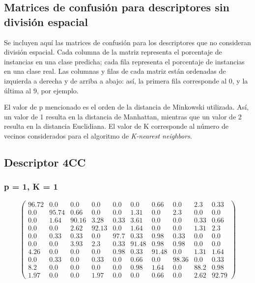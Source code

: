 \begin{appendices}

\section{Matrices de confusión para descriptores sin división espacial}

Se incluyen aquí las matrices de confusión para los descriptores que no
consideran división espacial. Cada columna de la matriz representa el porcentaje
de instancias en una clase predicha; cada fila representa el porcentaje de
instancias en una clase real. Las columnas y filas de cada matriz están
ordenadas de izquierda a derecha y de arriba a abajo: así, la primera fila
corresponde al 0, y la última al 9, por ejemplo.

El valor de p mencionado es el orden de la distancia de Minkowski utilizada.
Así, un valor de 1 resulta en la distancia de Manhattan, mientras que un valor
de 2 resulta en la distancia Euclidiana. El valor de K corresponde al número de
vecinos considerados para el algoritmo de \emph{K-nearest neighbors}.

\subsection{Descriptor 4CC}

\subsubsection*{p = 1, K = 1}

$$\begin{pmatrix}
96.72&0.0&0.0&0.0&0.0&0.0&0.66&0.0&2.3&0.33\\
0.0&95.74&0.66&0.0&0.0&1.31&0.0&2.3&0.0&0.0\\
0.0&1.64&90.16&3.28&0.33&3.61&0.0&0.0&0.33&0.66\\
0.0&0.0&2.62&92.13&0.0&1.64&0.0&0.0&1.31&2.3\\
0.0&0.33&0.33&0.0&97.7&0.33&0.98&0.33&0.0&0.0\\
0.0&0.0&3.93&2.3&0.33&91.48&0.98&0.98&0.0&0.0\\
4.26&0.0&0.0&0.0&0.98&0.33&91.48&0.0&1.31&1.64\\
0.0&0.33&0.0&0.33&0.0&0.66&0.0&98.36&0.0&0.33\\
8.2&0.0&0.0&0.0&0.0&0.98&1.64&0.0&88.2&0.98\\
1.97&0.0&0.0&1.97&0.0&0.0&0.66&0.0&2.62&92.79
\end{pmatrix}$$


\end{appendices}
